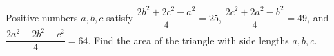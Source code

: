 Positive numbers $a,b,c$ satisfy $\dfrac{2b^2+2c^2-a^2}{4}=25$, $\dfrac{2c^2+2a^2-b^2}{4}=49$, and $\dfrac{2a^2+2b^2-c^2}{4}=64$. Find the area of the triangle with side lengths $a,b,c$.
